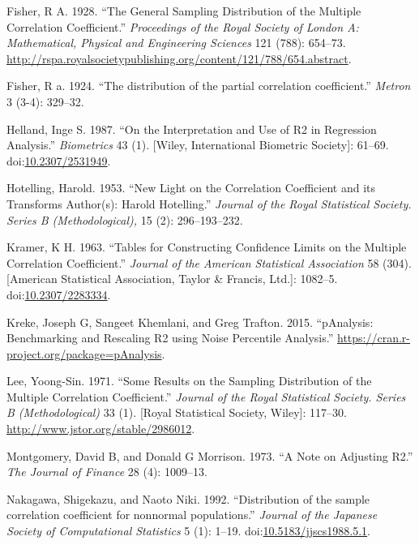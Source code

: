 \documentclass[]{article}
\begin{document}
\hypertarget{ref-Fisher1928}{}
Fisher, R A. 1928. ``The General Sampling Distribution of the Multiple
Correlation Coefficient.'' \emph{Proceedings of the Royal Society of
London A: Mathematical, Physical and Engineering Sciences} 121 (788):
654--73.
\url{http://rspa.royalsocietypublishing.org/content/121/788/654.abstract}.

\hypertarget{ref-Fisher1924}{}
Fisher, R a. 1924. ``The distribution of the partial correlation
coefficient.'' \emph{Metron} 3 (3-4): 329--32.

\hypertarget{ref-Helland1987}{}
Helland, Inge S. 1987. ``On the Interpretation and Use of R2 in
Regression Analysis.'' \emph{Biometrics} 43 (1). {[}Wiley, International
Biometric Society{]}: 61--69.
doi:\href{https://doi.org/10.2307/2531949}{10.2307/2531949}.

\hypertarget{ref-Hotelling1953}{}
Hotelling, Harold. 1953. ``New Light on the Correlation Coefficient and
its Transforms Author(s): Harold Hotelling.'' \emph{Journal of the Royal
Statistical Society. Series B (Methodological),} 15 (2): 296--193--232.

\hypertarget{ref-Kramer1963}{}
Kramer, K H. 1963. ``Tables for Constructing Confidence Limits on the
Multiple Correlation Coefficient.'' \emph{Journal of the American
Statistical Association} 58 (304). {[}American Statistical Association,
Taylor \& Francis, Ltd.{]}: 1082--5.
doi:\href{https://doi.org/10.2307/2283334}{10.2307/2283334}.

\hypertarget{ref-Kreke2015}{}
Kreke, Joseph G, Sangeet Khemlani, and Greg Trafton. 2015. ``pAnalysis:
Benchmarking and Rescaling R2 using Noise Percentile Analysis.''
\url{https://cran.r-project.org/package=pAnalysis}.

\hypertarget{ref-Lee1971}{}
Lee, Yoong-Sin. 1971. ``Some Results on the Sampling Distribution of the
Multiple Correlation Coefficient.'' \emph{Journal of the Royal
Statistical Society. Series B (Methodological)} 33 (1). {[}Royal
Statistical Society, Wiley{]}: 117--30.
\url{http://www.jstor.org/stable/2986012}.

\hypertarget{ref-Montgomery1973}{}
Montgomery, David B, and Donald G Morrison. 1973. ``A Note on Adjusting
R2.'' \emph{The Journal of Finance} 28 (4): 1009--13.

\hypertarget{ref-Nakagawa1992}{}
Nakagawa, Shigekazu, and Naoto Niki. 1992. ``Distribution of the sample
correlation coefficient for nonnormal populations.'' \emph{Journal of
the Japanese Society of Computational Statistics} 5 (1): 1--19.
doi:\href{https://doi.org/10.5183/jjscs1988.5.1}{10.5183/jjscs1988.5.1}.
\end{document}
